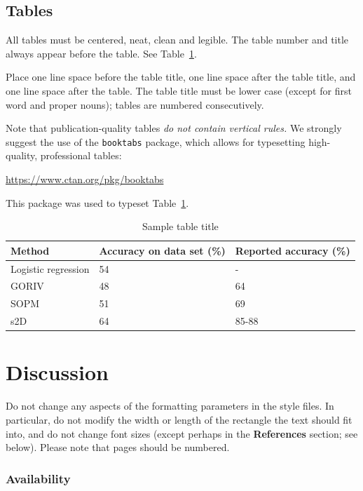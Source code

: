 \documentclass{article}
\begin{document}
\subsection{Tables}

All tables must be centered, neat, clean and legible.  The table
number and title always appear before the table.  See
Table~\ref{sample-table}.

Place one line space before the table title, one line space after the
table title, and one line space after the table. The table title must
be lower case (except for first word and proper nouns); tables are
numbered consecutively.

Note that publication-quality tables \emph{do not contain vertical
  rules.} We strongly suggest the use of the \verb+booktabs+ package,
which allows for typesetting high-quality, professional tables:
\begin{center}
  \url{https://www.ctan.org/pkg/booktabs}
\end{center}
This package was used to typeset Table~\ref{sample-table}.

\begin{table}[t]
  \caption{Sample table title}
  \label{sample-table}
  \centering
  \begin{tabular}{lll}
    \toprule

    Method     & Accuracy on data set (\%)    & Reported accuracy (\%)\\
    \midrule
    Logistic regression & 54 & -     \\
    GORIV     & 48 & 64      \\
    SOPM     & 51      & 69  \\
    s2D     & 64       & 85-88  \\
    \bottomrule
  \end{tabular}
\end{table}

\section{Discussion}

Do not change any aspects of the formatting parameters in the style
files.  In particular, do not modify the width or length of the
rectangle the text should fit into, and do not change font sizes
(except perhaps in the \textbf{References} section; see below). Please
note that pages should be numbered.


\subsubsection*{Availability}
\end{document}
